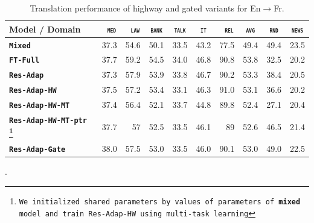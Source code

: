 \documentclass[11pt,a4paper]{article}
\newcommand{\fyFuture}[1]{\done[FY]\Todo[FY:]{\textcolor{red}{#1}}}
\newcommand{\domain}[1]{\texttt{\textsc{#1}}}
\newcommand{\system}[1]{\texttt{\textbf{#1}}}
\begin{document}
\begin{table}[htbp]
  \centering
  \begin{tabular}{|p{4.8cm}|*{7}{r|}|r|r|} \hline
    Model / Domain & \multicolumn{1}{c|}{\domain{ med}} & \multicolumn{1}{c|}{\domain{ law}} & \multicolumn{1}{c|}{\domain{bank}} & \multicolumn{1}{c|}{\domain{talk}} & \multicolumn{1}{c|}{\domain{ it }} & \multicolumn{1}{c|}{\domain{ rel}} & \multicolumn{1}{c||}{\domain{avg}} & \multicolumn{1}{c|}{\domain{rnd}} & \multicolumn{1}{c|}{\domain{news}} \\ \hline %
    \system{Mixed}             & 37.3 & 54.6 & 50.1 & 33.5 & 43.2 & 77.5     &  49.4 & 49.4 & 23.5 \\ %
    \system{FT-Full}             & 37.7 & 59.2 & 54.5 & 34.0 & 46.8 & 90.8   & 53.8 & 32.5 & 20.2  \\ %
    \system{Res-Adap}         & 37.3 & 57.9 & 53.9 & 33.8 & 46.7 & 90.2   & 53.3 & 38.4 & 20.5 \\ %
    \system{Res-Adap-HW}   & 37.5 & 57.2 & 53.4 & 33.1 & 46.3 & 91.0  & 53.1 & 36.6 & 20.2 \\ %
    \system{Res-Adap-HW-MT} & 37.4 & 56.4 & 52.1 & 33.7 & 44.8 & 89.8 & 52.4 & 27.1 & 20.4 \\ %
    \system{Res-Adap-HW-MT-ptr \footnote{We initialized shared parameters by values of parameters of \system{mixed} model and train Res-Adap-HW using multi-task learning}} & 37.7 & 57 & 52.5 & 33.5 & 46.1 & 89 & 52.6 & 46.5 & 21.4 \\ %
    \system{Res-Adap-Gate}  & 38.0 & 57.5& 53.0 & 33.5 & 46.0 & 90.1  & 53.0 & 49.0 & 22.5 \\ %
    \hline
  \end{tabular}
  \caption{Translation performance of highway and gated variants for En$\rightarrow$Fr.
  }
  \label{tab:performance-random}
\end{table}
\fyFuture{Computation time should also report the time it takes for the complete tuning process, not one iteration which will be more or less the same}.
\end{document}

